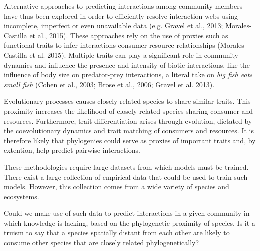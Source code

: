 \documentclass[letterpaper]{article}
\begin{document}

Alternative approaches to predicting interactions among community members have thus been explored in order to efficiently resolve interaction webs using incomplete, imperfect or even unavailable data (e.g. Gravel et al., 2013; Morales-Castilla et al., 2015). These approaches rely on the use of proxies such as functional traits to infer interactions consumer-resource relationships (Morales-Castilla et al. 2015). Multiple traits can play a significant role in community dynamics and influence the presence and intensity of biotic interactions, like the influence of body size on predator-prey interactions, a literal take on \textit{big fish eats small fish} (Cohen et al., 2003; Brose et al., 2006; Gravel et al. 2013).

Evolutionary processes causes closely related species to share similar traits. This proximity increases the likelihood of closely related species sharing consumer and resources. Furthermore, trait differentiation arises through evolution, dictated by the coevolutionary dynamics and trait matching of consumers and resources. It is therefore likely that phylogenies could serve as proxies of important traits and, by extention, help predict pairwise interactions.




These methodologies require large datasets from which models must be trained. There exist a large collection of empirical data that could be used to train such models. However, this collection comes from a wide variety of species and ecosystems.

Could we make use of such data to predict interactions in a given community in which knowledge is lacking, based on the phylogenetic proximity of species. Is it a truism to say that a species spatially distant from each other are likely to consume other species that are closely related phylogenetically?
\end{document}
